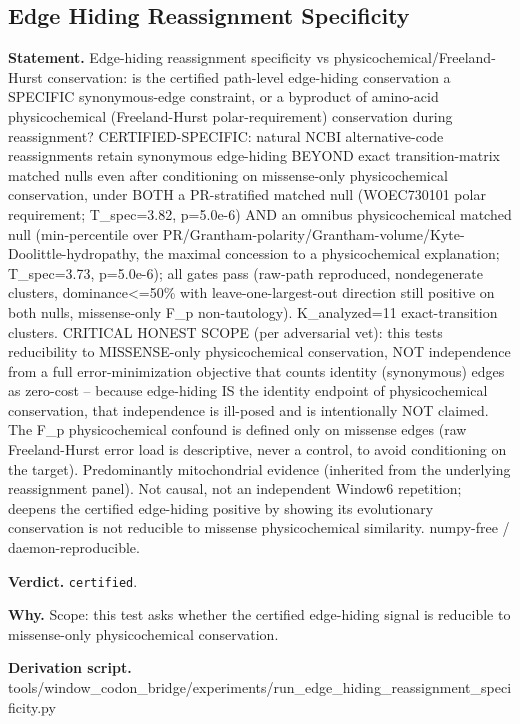 \subsection{Edge Hiding Reassignment Specificity}\label{sec:bridge-edge-hiding-reassignment-specificity}
\textbf{Statement.} Edge-hiding reassignment specificity vs physicochemical/Freeland-Hurst conservation: is the
certified path-level edge-hiding conservation a SPECIFIC synonymous-edge constraint, or a byproduct
of amino-acid physicochemical (Freeland-Hurst polar-requirement) conservation during reassignment?
CERTIFIED-SPECIFIC: natural NCBI alternative-code reassignments retain synonymous edge-hiding BEYOND
exact transition-matrix matched nulls even after conditioning on missense-only physicochemical
conservation, under BOTH a PR-stratified matched null (WOEC730101 polar requirement; T\_spec=3.82,
p=5.0e-6) AND an omnibus physicochemical matched null (min-percentile over
PR/Grantham-polarity/Grantham-volume/Kyte-Doolittle-hydropathy, the maximal concession to a
physicochemical explanation; T\_spec=3.73, p=5.0e-6); all gates pass (raw-path reproduced,
nondegenerate clusters, dominance<=50\% with leave-one-largest-out direction still positive on both
nulls, missense-only F\_p non-tautology). K\_analyzed=11 exact-transition clusters. CRITICAL HONEST
SCOPE (per adversarial vet): this tests reducibility to MISSENSE-only physicochemical conservation,
NOT independence from a full error-minimization objective that counts identity (synonymous) edges as
zero-cost -- because edge-hiding IS the identity endpoint of physicochemical conservation, that
independence is ill-posed and is intentionally NOT claimed. The F\_p physicochemical confound is
defined only on missense edges (raw Freeland-Hurst error load is descriptive, never a control, to
avoid conditioning on the target). Predominantly mitochondrial evidence (inherited from the
underlying reassignment panel). Not causal, not an independent Window6 repetition; deepens the
certified edge-hiding positive by showing its evolutionary conservation is not reducible to missense
physicochemical similarity. numpy-free / daemon-reproducible.

\textbf{Verdict.} \texttt{certified}.

\textbf{Why.} Scope: this test asks whether the certified edge-hiding signal is reducible to missense-only
physicochemical conservation.

\textbf{Derivation script.} tools/window\_codon\_bridge/experiments/run\_edge\_hiding\_reassignment\_specificity.py

